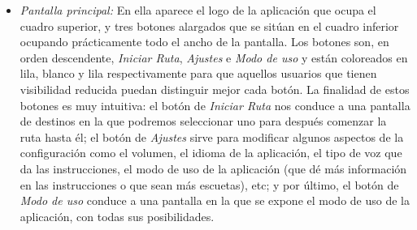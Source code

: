 \begin{itemize}
	\item \textit{Pantalla principal:} En ella aparece el logo de la aplicación que ocupa el cuadro superior, y tres botones alargados que se sitúan en el cuadro inferior ocupando prácticamente todo el ancho de la pantalla. Los botones son, en orden descendente, \textit{Iniciar Ruta}, \textit{Ajustes} e \textit{Modo de uso} y están coloreados en lila, blanco y lila respectivamente para que aquellos usuarios que tienen visibilidad reducida puedan distinguir mejor cada botón. La finalidad de estos botones es muy intuitiva: el botón de \textit{Iniciar Ruta} nos conduce a una pantalla de destinos en la que podremos seleccionar uno para después comenzar la ruta hasta él; el botón de \textit{Ajustes} sirve para modificar algunos aspectos de la configuración como el volumen, el idioma de la aplicación, el tipo de voz que da las instrucciones, el modo de uso de la aplicación (que dé más información en las instrucciones o que sean más escuetas), etc; y por último, el botón de \textit{Modo de uso} conduce a una pantalla en la que se expone el modo de uso de la aplicación, con todas sus posibilidades.
	

\end{itemize}
